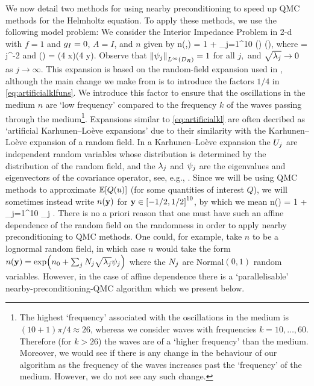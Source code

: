 We now detail two methods for using nearby preconditioning to speed up QMC methods for the Helmholtz equation. To apply these methods, we use the following model problem: We consider the Interior Impedance Problem in 2-d with $f=1$ and $g_{I}=0$, $A = I$, and $n$ given by
\beq\label{eq:artificialkl}
n(\omega,\bx) = 1 + \sum_{j=1}^{10} \Uj(\omega) \sqrt{\lambdaj} \psij(\bx),
\eeq
where
\beq\label{eq:artificialkllambdas}
\sqrt{\lambdaj} = j^{-2}
\eeq
and
\beq\label{eq:artificialklfuns}
\psij(\bx) = \cos\mleft(4 x\mright)\cos\mleft(4 y\mright).
\eeq
Observe that $\NLiDR{\psij}=1$ for all $j,$ and $\sqrt{\lambda_{j}} \rightarrow 0$ as $j \rightarrow \infty.$ This expansion is based on the random-field expansion used in \cite[Section 5.1]{GiGrKuScSl:19}, although the main change we make from \cite{GiGrKuScSl:19} is to introduce the factors $1/4$ in \cref{eq:artificialklfuns}. We introduce this factor to ensure that the oscillations in the medium $n$ are `low frequency' compared to the frequency $k$ of the waves passing through the medium\footnote{The highest `frequency' associated with the oscillations in the medium is $(10+1)\pi/4 \approx 26$, whereas we consider waves with frequencies $k=10,\ldots,60$. Therefore (for $k > 26$) the waves are of a `higher frequency' than the medium. Moreover, we would see if there is any change in the behaviour of our algorithm as the frequency of the waves increases past the `frequency' of the medium. However, we do not see any such change.}. Expansions similar to \cref{eq:artificialkl} are often decribed as `artificial Karhunen--Lo\`eve expansions' due to their similarity with the Karhunen--Lo\`eve expansion of a random field. In a Karhunen--Lo\`eve expansion the $U_{j}$ are independent random variables whose distribution is determined by the distribution of the random field, and the $\lambda_{j}$ and $\psi_{j}$ are the eigenvalues and eigenvectors of the covariance operator, see, e.g., \cite[Section 7.4]{LoPoSh:14}. Since we will be using QMC methods to approximate $\EXP{Q(u)}$ (for some quantities of interest $Q$), we will sometimes instead write $n(\mathbf{y})$ for $\by \in \cube{10}$, by which we mean
\beqs
n(\by) = 1 + \sum_{j=1}^{10} \by_{j} \sqrt{\lambdaj} \psij.
\eeqs
There is no a priori reason that one must have such an affine dependence of the random field on the randomness in order to apply nearby preconditioning to QMC methods. One could, for example, take $n$ to be a lognormal random field, in which case $n$ would take the form $n(\by) = \exp\mleft(\nz + \sum_j \Nj \sqrt{\lambdaj} \psij\mright)$ where the $N_{j}$ are Normal$(0,1)$ random variables. However, in the case of affine dependence there is a `parallelisable' nearby-preconditioning-QMC algorithm which we present below.

